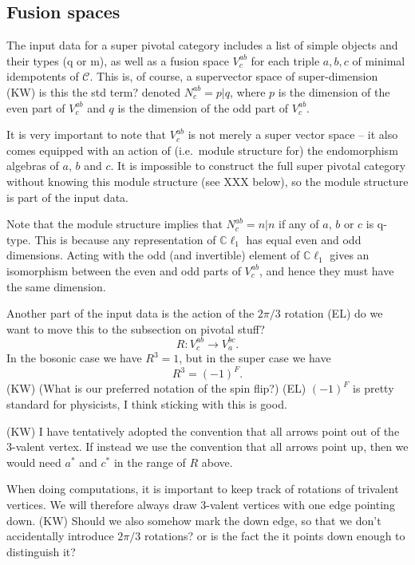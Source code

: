 \documentclass[12pt,a4paper]{article}
\newcounter{arrow}
\newcommand\be            {\begin{equation}}
\newcommand\ee            {\end{equation}}
\newcommand{\mcc}{\mathcal{C}}
\newcommand{\cl}{\mathbb{C}\ell}
\newcommand{\ethan}[1]{{\color{amethyst}\footnotesize{(EL) #1}}}
\newcommand{\kw}[1]{{\color{kwcolor}\footnotesize{(KW) #1}}}
\begin{document}
\subsection{Fusion spaces} \label{fusion_spaces}

The input data for a super pivotal category includes a list of simple objects and their types (q or m), as well as a fusion space $V^{ab}_c$ for each triple $a,b,c$ of minimal idempotents
of $\mcc$.
This is, of course, a supervector space of super-dimension \kw{is this the std term?} 
denoted $N^{ab}_c = p|q$, where $p$ is the dimension of the even part
of $V^{ab}_c$ and $q$ is the dimension of the odd part of $V^{ab}_c$.

It is very important to note that $V^{ab}_c$ is not merely a super vector space -- it also comes equipped with an action
of (i.e.\ module structure for) the endomorphism algebras of $a$, $b$ and $c$.
It is impossible to construct the full super pivotal category without knowing this module structure (see XXX below), 
so the module
structure is part of the input data.

Note that the module structure implies that $N^{ab}_c = n|n$ if any of $a$, $b$ or $c$ is q-type.
This is because any representation of $\cl_1$ has equal even and odd dimensions.
Acting with the odd (and invertible) element of $\cl_1$ gives an isomorphism between the even and odd parts of $V^{ab}_c$, and hence they must have the same dimension.

Another part of the input data is the action of the $2\pi/3$ rotation \ethan{do we want to move this to the subsection on pivotal stuff?}
\be
	R : V^{ab}_c \to V^{bc}_a .
\ee
In the bosonic case we have $R^3 = 1$, but in the super case we have
\be
	R^3 = (-1)^F .
\ee
\kw{(What is our preferred notation of the spin flip?)} \ethan{$(-1)^F$ is pretty standard for physicists, I think sticking with this is good.}

\kw{I have tentatively adopted the convention that all arrows point out of the 3-valent vertex.
If instead we use the convention that all arrows point up, then we would need $a^*$ and $c^*$ in the range of $R$ above.}

When doing computations, it is important to keep track of rotations of trivalent vertices.
We will therefore always draw 3-valent vertices with one edge pointing down.
\kw{Should we also somehow mark the down edge, so that we don't accidentally introduce $2\pi/3$ rotations?
or is the fact the it points down enough to distinguish it?}
\end{document}
